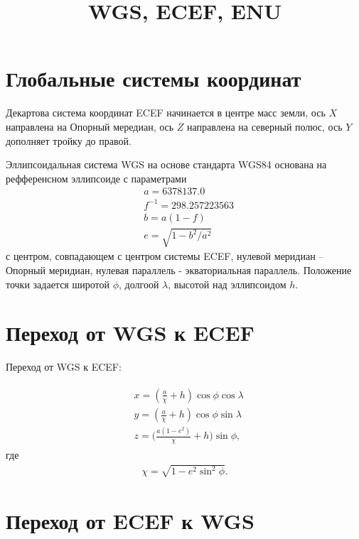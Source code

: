 \documentclass[a4paper,12pt]{article}
\title{WGS, ECEF, ENU}
\author{}
\begin{document}
\maketitle

\section{Глобальные системы координат}
\quad

Декартова система координат ECEF начинается в центре масс земли,
ось $X$ направлена на Опорный мередиан,
ось $Z$ направлена на северный полюс,
ось $Y$ дополняет тройку до правой.

Эллипсоидальная система WGS на основе стандарта WGS84 основана на рефференсном эллипсоиде с параметрами
\begin{align} 
\label{eq:WGS_params}
&a = 6378137.0 \\
&f^{-1} = 298.257223563 \\
&b = a(1 - f) \\
&e = \sqrt{1 - b^2 / a^2}
\end{align}
с центром, совпадающем с центром системы ECEF,
нулевой меридиан -- Опорный меридиан,
нулевая параллель - экваториальная параллель.
Положение точки задается
широтой $\phi$,
долгоой $\lambda$,
высотой над эллипсоидом $h$.

\section{Переход от WGS к ECEF}
Переход от  WGS к ECEF:

\begin{align} 
\begin{split} \label{eq:WGS_to_ECEF}
&x = (\frac{a}{\chi} + h) \cos \phi \cos \lambda \\
&y = (\frac{a}{\chi} + h) \cos \phi \sin \lambda \\
&z = \Big(\frac{a(1-e^2)}{\chi} + h \Big) \sin \phi,
\end{split}
\end{align}
где
\begin{align*} 
\chi = \sqrt{1 - e^2 \sin^2 \phi}.
\end{align*}

\section{Переход от ECEF к WGS}
\end{document}
